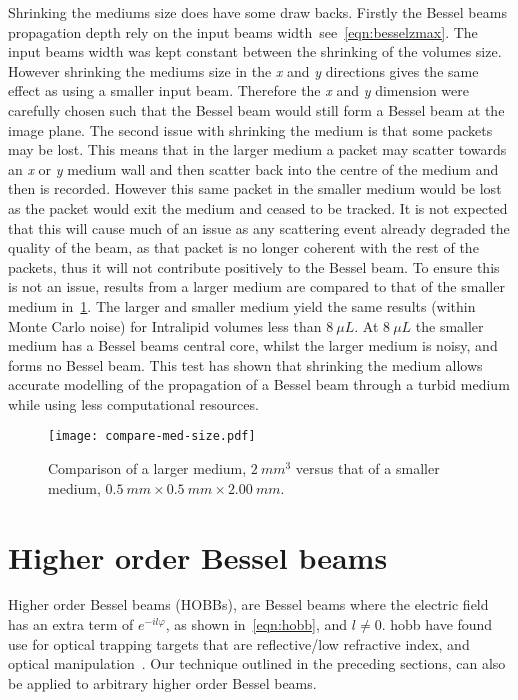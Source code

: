Shrinking the mediums size does have some draw backs.
Firstly the Bessel beams propagation depth rely on the input beams width\ see~\cref{eqn:besselzmax}.
The input beams width was kept constant between the shrinking of the volumes size.
However shrinking the mediums size in the \textit{x} and \textit{y} directions gives the same effect as using a smaller input beam.
Therefore the \textit{x} and \textit{y} dimension were carefully chosen such that the Bessel beam would still form a Bessel beam at the image plane.
The second issue with shrinking the medium is that some packets may be lost.
This means that in the larger medium a packet may scatter towards an \textit{x} or \textit{y} medium wall and then scatter back into the centre of the medium and then is recorded.
However this same packet in the smaller medium would be lost as the packet would exit the medium and ceased to be tracked.
It is not expected that this will cause much of an issue as any scattering event already degraded the quality of the beam, as that packet is no longer coherent with the rest of the packets, thus it will not contribute positively to the Bessel beam.
To ensure this is not an issue, results from a larger medium are compared to that of the smaller medium in~\cref{fig:compareBigSmall}.
The larger and smaller medium yield the same results (within Monte Carlo noise) for Intralipid volumes less than $8~\mu L$.
At $8~\mu L$ the smaller medium has a Bessel beams central core, whilst the larger medium is noisy, and forms no Bessel beam.
This test has shown that shrinking the medium allows accurate modelling of the propagation of a Bessel beam through a turbid medium while using less computational resources.

\begin{figure}[!ht]
    \centering
    \texttt{[image: compare-med-size.pdf]}
    \caption{Comparison of a larger medium, $2~mm^3$ versus that of a smaller medium, $0.5~mm \times 0.5~mm \times 2.00~mm$.}
    \label{fig:compareBigSmall}
\end{figure}

\FloatBarrier

\section{Higher order Bessel beams}

Higher order Bessel beams (HOBBs), are Bessel beams where the electric field has an extra term of $e^{-il\varphi}$, as shown in~\cref{eqn:hobb}, and $l \neq 0$.
\Gls*{hobb} have found use for optical trapping targets that are reflective/low refractive index, and optical manipulation~\cite{garces2002transfer,garces2003observation}.
Our technique outlined in the preceding sections, can also be applied to arbitrary higher order Bessel beams. 

